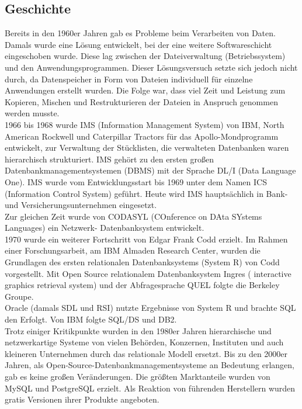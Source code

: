 \documentclass[12pt,a4paper]{report}
\begin{document}
\begin{onehalfspace}
\section{Geschichte}
Bereits in den 1960er Jahren gab es Probleme beim Verarbeiten von Daten. Damals wurde eine Lösung entwickelt, bei der eine weitere Softwareschicht eingeschoben wurde. Diese lag zwischen der Dateiverwaltung (Betriebssystem) und den Anwendungsprogrammen. Dieser Lösungsversuch setzte sich jedoch nicht durch, da Datenspeicher in Form von Dateien individuell für einzelne Anwendungen erstellt wurden. Die Folge war, dass viel Zeit und Leistung zum Kopieren, Mischen und Restrukturieren der Dateien in Anspruch genommen werden musste.\\

1966 bis 1968 wurde IMS (Information Management System) von IBM, North American Rockwell und Caterpillar Tractors für das Apollo-Mondprogramm entwickelt, zur Verwaltung der Stücklisten, die verwalteten Datenbanken waren hierarchisch strukturiert. IMS gehört zu den ersten großen Datenbankmanagementsystemen (DBMS) mit der Sprache DL/I (Data Language One). IMS wurde vom Entwicklungsstart bis 1969 unter dem Namen  ICS (Information Control System) geführt. Heute wird IMS hauptsächlich in Bank- und Versicherungsunternehmen eingesetzt.\\

Zur gleichen Zeit wurde von CODASYL (COnference on DAta SYstems Languages) ein Netzwerk- Datenbanksystem entwickelt.\\

1970 wurde ein weiterer Fortschritt von Edgar Frank Codd erzielt. Im Rahmen einer Forschungsarbeit, am IBM Almaden Research Center, wurden die Grundlagen des ersten relationalen Datenbanksystems (System R) von Codd vorgestellt. Mit Open Source relationalem Datenbanksystem Ingres ( interactive graphics retrieval system) und der Abfragesprache QUEL folgte die Berkeley Groupe.\\

Oracle (damals SDL und RSI) nutzte Ergebnisse von System R und brachte SQL den Erfolgt.  Von IBM folgte SQL/DS und DB2.\\

Trotz einiger Kritikpunkte wurden in den 1980er Jahren hierarchische und netzwerkartige Systeme von vielen Behörden, Konzernen, Instituten und auch kleineren Unternehmen durch das relationale Modell ersetzt. Bis zu den 2000er Jahren, als Open-Source-Datenbankmanagementsysteme an Bedeutung erlangen, gab es keine großen Veränderungen. Die größten Marktanteile wurden von MySQL und PostgreSQL erzielt.
Als Reaktion von führenden Herstellern wurden gratis Versionen ihrer Produkte angeboten.\\


\end{onehalfspace}
\end{document}
